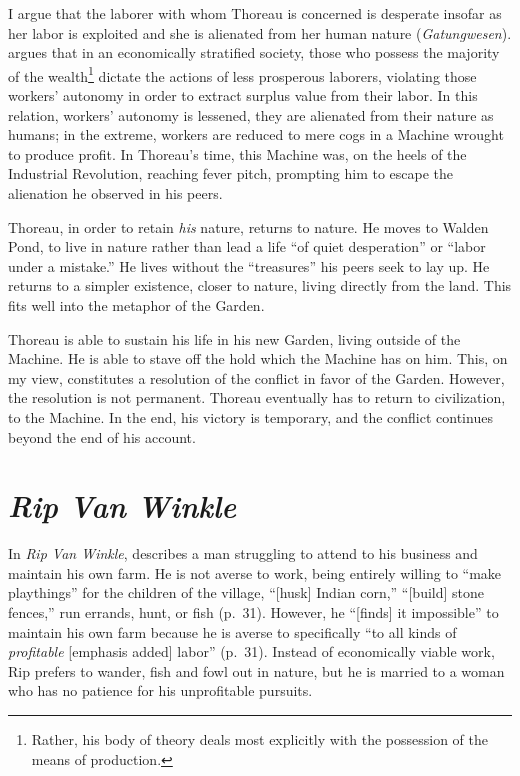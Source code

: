 \documentclass[man,12pt,natbib]{apa6}
\begin{document}
I argue that the laborer with whom Thoreau is concerned is desperate insofar as
her labor is exploited and she is alienated from her human nature
(\emph{Gatungwesen}). \citet{Marx44} argues that in an economically stratified
society, those who possess the majority of the wealth\footnote{Rather, his body
of theory deals most explicitly with the possession of the means of
production.} dictate the actions of less prosperous laborers, violating those
workers' autonomy in order to extract surplus value from their labor. In this
relation, workers' autonomy is lessened, they are alienated from their nature
as humans; in the extreme, workers are reduced to mere cogs in a Machine
wrought to produce profit. In Thoreau's time, this Machine was, on the heels of
the Industrial Revolution, reaching fever pitch, prompting him to escape the
alienation he observed in his peers.

Thoreau, in order to retain \emph{his} nature, returns to nature. He moves to
Walden Pond, to live in nature rather than lead a life ``of quiet desperation''
or ``labor under a mistake.'' He lives without the ``treasures'' his peers seek
to lay up. He returns to a simpler existence, closer to nature, living directly
from the land. This fits well into the metaphor of the Garden.

Thoreau is able to sustain his life in his new Garden, living outside of the
Machine. He is able to stave off the hold which the Machine has on him. This,
on my view, constitutes a resolution of the conflict in favor of the Garden.
However, the resolution is not permanent. Thoreau eventually has to return to
civilization, to the Machine. In the end, his victory is temporary, and the
conflict continues beyond the end of his account.


\section{\emph{Rip Van Winkle}}

In \emph{Rip Van Winkle}, \citet{Irving12} describes a man struggling to attend
to his business and maintain his own farm.  He is not averse to work, being
entirely willing to ``make playthings'' for the children of the village,
``[husk] Indian corn,'' ``[build] stone fences,'' run errands, hunt, or fish
(p.~31). However, he ``[finds] it impossible'' to maintain his own farm because
he is averse to specifically ``to all kinds of \emph{profitable} [emphasis
added] labor'' (p.~31).  Instead of economically viable work, Rip prefers to
wander, fish and fowl out in nature, but he is married to a woman who has no
patience for his unprofitable pursuits.
\end{document}
